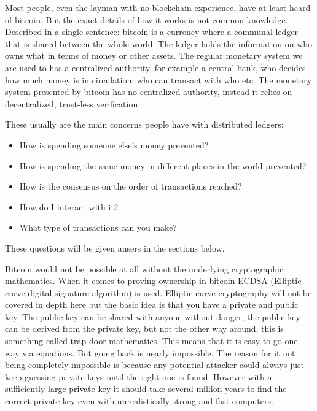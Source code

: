 Most people, even the layman with no blockchain experience, have at least heard of bitcoin. But the exact details of how it works is not common knowledge. Described in a single sentence: bitcoin is a currency where a communal ledger that is shared between the whole world. The ledger holds the information on who owns what in terms of money or other assets. The regular monetary system we are used to has a centralized authority, for example a central bank, who decides how much money is in circulation, who can transact with who etc. The monetary system presented by bitcoin has no centralized authority, instead it relies on decentralized, trust-less verification.

These usually are the main concerns people have with distributed ledgers:
\begin{itemize}
	\item How is spending someone else's money prevented?
	\item How is spending the same money in different places in the world prevented?
	\item How is the consensus on the order of transactions reached?
	\item How do I interact with it?
	\item What type of transactions can you make?
\end{itemize}

These questions will be given ansers in the sections below.

Bitcoin would not be possible at all without the underlying cryptographic mathematics. When it comes to proving ownership in bitcoin ECDSA (Elliptic curve digital signature algorithm) is used. Elliptic curve cryptography will not be covered in depth here but the basic idea is that you have a private and public key. The public key can be shared with anyone without danger, the public key can be derived from the private key, but not the other way around, this is something called trap-door mathematics. This means that it is easy to go one way via equations. But going back is nearly impossible. The reason for it not being completely impossible is because any potential attacker could always just keep guessing private keys until the right one is found. However with a sufficiently large private key it should take several million years to find the correct private key even with unrealistically strong and fast computers. 


